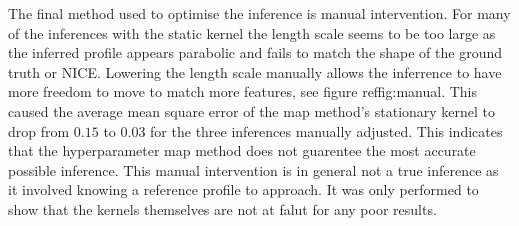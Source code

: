 The final method used to optimise the inference is manual intervention. For many of the inferences with the static kernel the length scale seems to be too large as the inferred profile appears parabolic and fails to match the shape of the ground truth or NICE. Lowering the length scale manually allows the inferrence to have more freedom to move to match more features, see figure ref{fig:manual}. This caused the average mean square error of the \gls{map} method's stationary kernel to drop from $0.15$ to $0.03$ for the three inferences manually adjusted. This indicates that the hyperparameter \gls{map} method does not guarentee the most accurate possible inference. This manual intervention is in general not a true inference as it involved knowing a reference profile to approach. It was only performed to show that the kernels themselves are not at falut for any poor results.  








